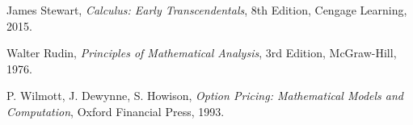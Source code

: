 \documentclass[12pt]{article}
\begin{document}
\begin{thebibliography}{9}

James Stewart,
\textit{Calculus: Early Transcendentals},
8th Edition, Cengage Learning, 2015.

Walter Rudin,
\textit{Principles of Mathematical Analysis},
3rd Edition, McGraw-Hill, 1976.

P. Wilmott, J. Dewynne, S. Howison,
\textit{Option Pricing: Mathematical Models and Computation},
Oxford Financial Press, 1993.

\end{thebibliography}
\end{document}
